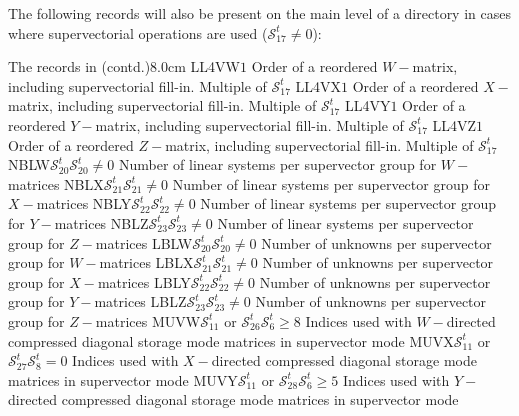 The following records will also be present on the main level of a 
directory in cases where supervectorial operations are used ($\mathcal{S}^{t}_{17}\ne 0$):

\begin{DescriptionEnregistrement}{The  records in
 (contd.)}{8.0cm}
\IntEnr
  {LL4VW}{$1$}
  {Order of a reordered $W-$matrix, including supervectorial fill-in. Multiple of $\mathcal{S}^{t}_{17}$}
\IntEnr
  {LL4VX}{$1$}
  {Order of a reordered $X-$matrix, including supervectorial fill-in. Multiple of $\mathcal{S}^{t}_{17}$}
\IntEnr
  {LL4VY}{$1$}
  {Order of a reordered $Y-$matrix, including supervectorial fill-in. Multiple of $\mathcal{S}^{t}_{17}$}
\IntEnr
  {LL4VZ}{$1$}
  {Order of a reordered $Z-$matrix, including supervectorial fill-in. Multiple of $\mathcal{S}^{t}_{17}$}
\OptIntEnr
  {NBLW}{$\mathcal{S}^{t}_{20}$}{$\mathcal{S}^{t}_{20}\ne 0$}
  {Number of linear systems per supervector group for $W-$matrices}
\OptIntEnr
  {NBLX}{$\mathcal{S}^{t}_{21}$}{$\mathcal{S}^{t}_{21}\ne 0$}
  {Number of linear systems per supervector group for $X-$matrices}
\OptIntEnr
  {NBLY}{$\mathcal{S}^{t}_{22}$}{$\mathcal{S}^{t}_{22}\ne 0$}
  {Number of linear systems per supervector group for $Y-$matrices}
\OptIntEnr
  {NBLZ}{$\mathcal{S}^{t}_{23}$}{$\mathcal{S}^{t}_{23}\ne 0$}
  {Number of linear systems per supervector group for $Z-$matrices}
\OptIntEnr
  {LBLW}{$\mathcal{S}^{t}_{20}$}{$\mathcal{S}^{t}_{20}\ne 0$}
  {Number of unknowns per supervector group for $W-$matrices}
\OptIntEnr
  {LBLX}{$\mathcal{S}^{t}_{21}$}{$\mathcal{S}^{t}_{21}\ne 0$}
  {Number of unknowns per supervector group for $X-$matrices}
\OptIntEnr
  {LBLY}{$\mathcal{S}^{t}_{22}$}{$\mathcal{S}^{t}_{22}\ne 0$}
  {Number of unknowns per supervector group for $Y-$matrices}
\OptIntEnr
  {LBLZ}{$\mathcal{S}^{t}_{23}$}{$\mathcal{S}^{t}_{23}\ne 0$}
  {Number of unknowns per supervector group for $Z-$matrices}
\OptIntEnr
  {MUVW}{$\mathcal{S}^{t}_{11}$ or $\mathcal{S}^{t}_{26}$}{$\mathcal{S}^{t}_{6}\ge 8$}
  {Indices used with $W-$directed compressed diagonal storage mode matrices in supervector mode}
\OptIntEnr
  {MUVX}{$\mathcal{S}^{t}_{11}$ or $\mathcal{S}^{t}_{27}$}{$\mathcal{S}^{t}_{8}=0$}
  {Indices used with $X-$directed compressed diagonal storage mode matrices in supervector mode}
\OptIntEnr
  {MUVY}{$\mathcal{S}^{t}_{11}$ or $\mathcal{S}^{t}_{28}$}{$\mathcal{S}^{t}_{6}\ge 5$}
  {Indices used with $Y-$directed compressed diagonal storage mode matrices in supervector mode}

\end{DescriptionEnregistrement}
